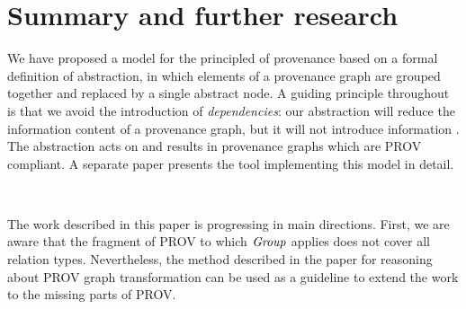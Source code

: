 
\section{Summary and further research}
\label{sec:further}

We have proposed a model for the principled  of provenance based on a formal definition of abstraction, in which elements of a provenance graph are grouped together and replaced by a single abstract node.  
A guiding principle  throughout is that we avoid the introduction of \emph{ dependencies}: our abstraction will reduce the information content of a provenance graph, but it will not introduce information .  
The abstraction acts on and results in provenance graphs which are PROV compliant.   A separate paper presents the tool implementing this model in detail.


~ 


The work described in this paper is progressing in  main directions.
%
First, we are aware that the fragment of PROV to which $\mathit{Group}$ applies does not cover all relation types. Nevertheless, the method described in the paper for reasoning about PROV graph transformation can be used as a guideline to extend the work to the missing parts of PROV.

